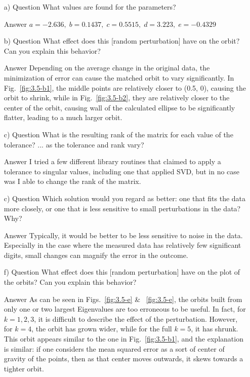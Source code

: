\documentclass[paper=a4, fontsize=11pt]{scrartcl}
\numberwithin{equation}{section}		%
\numberwithin{figure}{section}			%
\numberwithin{table}{section}				%
\begin{document}
\begin{enumerate}[(a)]
	\item[a) Question] What values are found for the parameters? \vspace{-2mm}
		\item[Answer] $a=-2.636, \; b=0.1437, \; c=0.5515, \; d=3.223, \; e=-0.4329$
	\item[b) Question] What effect does this [random perturbation] have on the orbit? Can you explain this behavior? \vspace{-2mm}
		\item[Answer] Depending on the average change in the original data, the minimization of error can cause the matched orbit to vary significantly. In Fig.~\ref{fig:3.5-b1}, the middle points are relatively closer to (0.5, 0), causing the orbit to shrink, while in Fig.~\ref{fig:3.5-b2}, they are relatively closer to the center of the orbit, causing wall of the calculated ellipse to be significantly flatter, leading to a much larger orbit.
	\item[c) Question] What is the resulting rank of the matrix for each value of the tolerance? ... as the tolerance and rank vary? \vspace{-2mm}
		\item[Answer] I tried a few different library routines that claimed to apply a tolerance to singular values, including one that applied SVD, but in no case was I able to change the rank of the matrix.
	\item[c) Question] Which solution would you regard as better: one that fits the data more closely, or one that is less sensitive to small perturbations in the data? Why? \vspace{-2mm}
		\item[Answer] Typically, it would be better to be less sensitive to noise in the data. Especially in the case where the measured data has relatively few significant digits, small changes can magnify the error in the outcome.
	\item[f) Question] What effect does this [random perturbation] have on the plot of the orbits? Can you explain this behavior? \vspace{-2mm}
		\item[Answer] As can be seen in Figs.~\ref{fig:3.5-e} \& ~\ref{fig:3.5-e}, the orbits built from only one or two largest Eigenvalues are too erroneous to be useful. In fact, for $k={1, 2, 3}$, it is difficult to describe the effect of the perturbation. However, for $k=4$, the orbit has grown wider, while for the full $k=5$, it has shrunk. This orbit appears similar to the one in Fig.~\ref{fig:3.5-b1}, and the explanation is similar: if one considers the mean squared error as a sort of center of gravity of the points, then as that center moves outwards, it skews towards a tighter orbit.

\end{enumerate}
\end{document}
